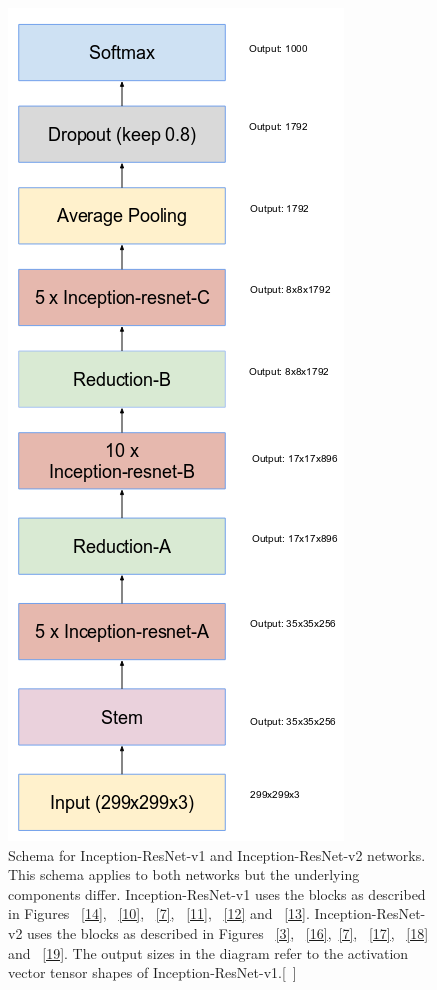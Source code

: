 \documentclass[a4paper,12pt, twoside]{NITKReport}
\begin{document}
\begin{figure}
\begin{minipage}[b]{0.4\textwidth}
    \includegraphics[width=\textwidth]{figure15.png}
    \caption{Schema   for   Inception-ResNet-v1   and   Inception-ResNet-v2 networks.  This schema applies to both networks but the underlying components differ.  Inception-ResNet-v1 uses the blocks as described in Figures ~\ref{14}, ~\ref{10}, ~\ref{7}, ~\ref{11}, ~\ref{12} and ~\ref{13}. Inception-ResNet-v2 uses the blocks as described in Figures ~\ref{3}, ~\ref{16},~\ref{7}, ~\ref{17}, ~\ref{18} and  ~\ref{19}. The output sizes in the diagram refer to the  activation vector tensor shapes of Inception-ResNet-v1.[~\cite{szegedy2017inception}]}
    \label{15}
  \end{minipage}
\end{figure}
\end{document}
